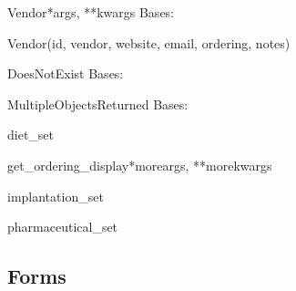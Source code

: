\documentclass[letterpaper,10pt,english]{sphinxmanual}
\begin{document}
\hypertarget{data.models.Vendor}{}\begin{classdesc}{Vendor}{*args, **kwargs}
Bases: 

Vendor(id, vendor, website, email, ordering, notes)

\hypertarget{data.models.Vendor.DoesNotExist}{}\begin{excdesc}{DoesNotExist}
Bases: 
\end{excdesc}

\hypertarget{data.models.Vendor.MultipleObjectsReturned}{}\begin{excdesc}{MultipleObjectsReturned}
Bases: 
\end{excdesc}

\hypertarget{data.models.Vendor.diet_set}{}\begin{memberdesc}[Vendor]{diet\_set}\end{memberdesc}

\hypertarget{data.models.Vendor.get_ordering_display}{}\begin{methoddesc}[Vendor]{get\_ordering\_display}{*moreargs, **morekwargs}\end{methoddesc}

\hypertarget{data.models.Vendor.implantation_set}{}\begin{memberdesc}[Vendor]{implantation\_set}\end{memberdesc}

\hypertarget{data.models.Vendor.pharmaceutical_set}{}\begin{memberdesc}[Vendor]{pharmaceutical\_set}\end{memberdesc}
\end{classdesc}


\subsection{Forms}
\hypertarget{module-data.forms}{}
\modulesynopsis{}
\end{document}
